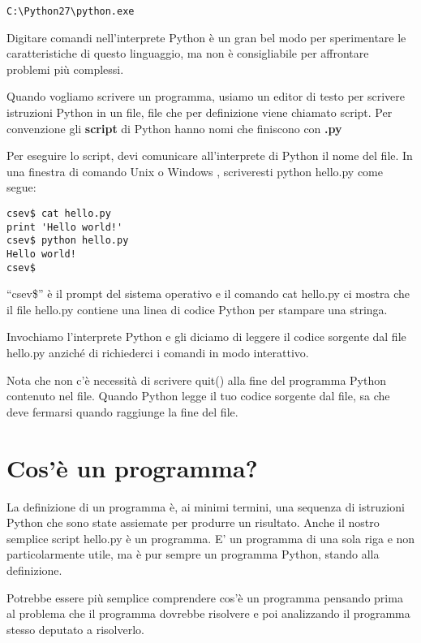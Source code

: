 \beforeverb
\begin{verbatim}
C:\Python27\python.exe
\end{verbatim}
\afterverb
%
Digitare comandi nell'interprete Python \`{e} un gran bel modo per sperimentare le caratteristiche di questo linguaggio, ma non \`{e} consigliabile per affrontare problemi pi\`{u} complessi.


Quando vogliamo scrivere un programma, usiamo un editor di testo per scrivere istruzioni Python in un file, file che per definizione viene chiamato script. Per convenzione gli \textbf{script }di Python hanno nomi che finiscono con\textbf{ .py}


Per eseguire lo script, devi comunicare all'interprete di Python il nome del file. In una finestra di comando Unix o Windows , scriveresti python hello.py come segue:


\beforeverb
\begin{verbatim}
csev$ cat hello.py
print 'Hello world!'
csev$ python hello.py
Hello world!
csev$
\end{verbatim}
\afterverb
%
{``}csev\$'' \`{e} il prompt del sistema operativo e il comando cat hello.py ci mostra che il file hello.py contiene una linea di codice Python per stampare una stringa.


Invochiamo l'interprete Python e gli diciamo di leggere il codice sorgente dal file hello.py anzich\'{e} di richiederci i comandi in modo interattivo.


Nota che non c'\`{e} necessit\`{a} di scrivere quit() alla fine del programma Python contenuto nel file. Quando Python legge il tuo codice sorgente dal file, sa che deve fermarsi quando raggiunge la fine del file.

\section{Cos'\`{e} un programma?}

La definizione di un programma \`{e}, ai minimi termini, una sequenza di istruzioni Python che sono state assiemate per produrre un risultato. Anche il nostro semplice script hello.py \`{e} un programma. E' un programma di una sola riga e non particolarmente utile, ma \`{e} pur sempre un programma Python, stando alla definizione.


Potrebbe essere pi\`{u} semplice comprendere cos'\`{e} un programma pensando prima al problema che il programma dovrebbe risolvere e poi analizzando il programma stesso deputato a risolverlo.


